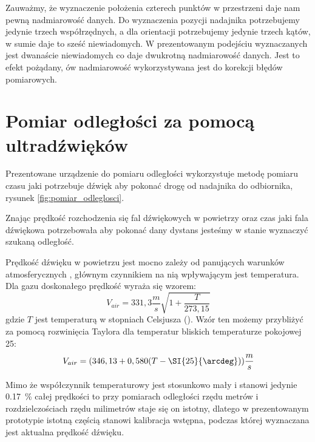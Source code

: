 Zauważmy, że wyznaczenie położenia czterech punktów w przestrzeni daje nam pewną nadmiarowość
danych. Do wyznaczenia pozycji nadajnika potrzebujemy jedynie trzech współrzędnych,
a dla orientacji potrzebujemy jedynie trzech kątów, w sumie daje to sześć niewiadomych.
W prezentowanym podejściu wyznaczanych jest dwanaście niewiadomych co daje dwukrotną nadmiarowość danych.
Jest to efekt pożądany, ów nadmiarowość wykorzystywana jest do korekcji błędów pomiarowych.


\section{Pomiar odległości za pomocą ultradźwięków}

Prezentowane urządzenie do pomiaru odległości wykorzystuje metodę pomiaru czasu jaki 
potrzebuje dźwięk aby pokonać drogę od nadajnika do odbiornika,
rysunek \ref{fig:pomiar_odleglosci}.

Znając prędkość rozchodzenia się fal dźwiękowych w powietrzy oraz czas jaki fala dźwiękowa potrzebowała
aby pokonać dany dystans jesteśmy w stanie wyznaczyć szukaną odległość.

Prędkość dźwięku w powietrzu jest mocno zależy od panujących warunków atmosferycznych \cite{bib:soundSpeed},  
głównym czynnikiem na nią wpływającym jest temperatura.
Dla gazu doskonałego prędkość wyraża się wzorem:
\[
V_{air} = 331,3  \frac{m}{s}  \sqrt{1+\frac{T}{273,15}}
\]
gdzie $T$ jest temperaturą w stopniach Celsjusza (\SI{}{\degC}).
Wzór ten możemy przybliżyć za pomocą rozwinięcia Taylora dla temperatur bliskich temperaturze pokojowej \SI{25}{\degC}:
\[
 V_{air} = (346,13  +  0,580(T - \SI{25}{\arcdeg})) \frac{m}{s}
\]

Mimo że współczynnik temperaturowy jest stosunkowo mały i stanowi jedynie \SI{0,17}{\%} całej prędkości
to przy pomiarach odległości rzędu metrów i rozdzielczościach rzędu milimetrów staje się on istotny, 
dlatego w prezentowanym prototypie istotną częścią stanowi kalibracja wstępna, podczas której
wyznaczana jest aktualna prędkość dźwięku.





